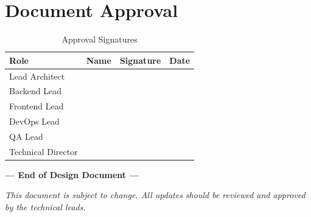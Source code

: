 \documentclass[12pt,a4paper]{report}
\begin{document}
\chapter*{Document Approval}

\begin{table}[H]
\centering
\begin{tabular}{|l|p{4cm}|p{4cm}|p{3cm}|}
\hline
\textbf{Role} & \textbf{Name} & \textbf{Signature} & \textbf{Date} \\
\hline
Lead Architect & & & \\[0.8cm]
\hline
Backend Lead & & & \\[0.8cm]
\hline
Frontend Lead & & & \\[0.8cm]
\hline
DevOps Lead & & & \\[0.8cm]
\hline
QA Lead & & & \\[0.8cm]
\hline
Technical Director & & & \\[0.8cm]
\hline
\end{tabular}
\caption*{Approval Signatures}
\end{table}

\vspace{2cm}

\begin{center}
\textbf{--- End of Design Document ---}

\vspace{1cm}

\textit{This document is subject to change. All updates should be reviewed and approved by the technical leads.}
\end{center}
\end{document}
